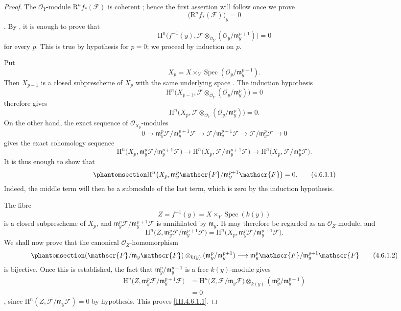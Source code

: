 \documentclass[oneside]{amsart}
\theoremstyle{ega-env-style}
\theoremstyle{ega-thm-env-style}
\theoremstyle{ega-defn-env-style}
\def\mathcal{\mathscr}
\def\sh{\mathcal}                   %
\def\HH{\mathrm{H}}                 %
\def\RR{\mathrm{R}}                 %
\def\kres{k}                        %
\def\Spec{\operatorname{Spec}}
\newcommand{\oldpage}[2][]{{\marginnote{\normalfont{\textbf{#1}~|~#2}}}\ignorespaces}
\let\EGAOriginalLabel\label
\renewcommand{\label}[1]{\phantomsection\EGAOriginalLabel{#1}}
\begin{document}
\begin{proof}
The $\sh{O}_Y$-module $\RR^n f_*(\sh{F})$ is coherent
; hence the first assertion will follow once we prove
\[
  \bigl(\RR^n f_*(\sh{F})\bigr)_y=0
\]
.  By , it is enough to prove that
\[
  \HH^n\bigl(f^{-1}(y),
    \sh{F}\otimes_{\sh{O}_Y}
      (\sh{O}_y/\mathfrak m_y^{p+1})\bigr)=0
\]
for every $p$.  This is true by hypothesis for $p=0$; we proceed by
induction on $p$.

Put
\[
  X_p=X\times_Y
    \Spec(\sh{O}_y/\mathfrak m_y^{p+1}).
\]
Then $X_{p-1}$ is a closed subprescheme of $X_p$ with the same
underlying space .  The induction hypothesis
\[
  \HH^n\bigl(X_{p-1},
    \sh{F}\otimes_{\sh{O}_Y}
      (\sh{O}_y/\mathfrak m_y^p)\bigr)=0
\]
therefore gives
\[
  \HH^n\bigl(X_p,
    \sh{F}\otimes_{\sh{O}_Y}
      (\sh{O}_y/\mathfrak m_y^p)\bigr)=0.
\]
On the other hand, the exact sequence of $\sh{O}_{X_p}$-modules
\[
  0\longrightarrow
  \mathfrak m_y^p\sh{F}/\mathfrak m_y^{p+1}\sh{F}
  \longrightarrow
  \sh{F}/\mathfrak m_y^{p+1}\sh{F}
  \longrightarrow
  \sh{F}/\mathfrak m_y^p\sh{F}
  \longrightarrow0
\]
gives the exact cohomology sequence
\[
  \HH^n\bigl(X_p,
    \mathfrak m_y^p\sh{F}/\mathfrak m_y^{p+1}\sh{F}\bigr)
  \longrightarrow
  \HH^n\bigl(X_p,\sh{F}/\mathfrak m_y^{p+1}\sh{F}\bigr)
  \longrightarrow
  \HH^n\bigl(X_p,\sh{F}/\mathfrak m_y^p\sh{F}\bigr).
\]
It is thus enough to show that
\[
\label{III.4.6.1.1}
  \HH^n\bigl(X_p,
    \mathfrak m_y^p\sh{F}/\mathfrak m_y^{p+1}\sh{F}\bigr)=0.
  \tag{4.6.1.1}
\]
Indeed, the middle term will then be a submodule of the last term,
which is zero by the induction hypothesis.

\oldpage[III]{140}

The fibre
\[
  Z=f^{-1}(y)=X\times_Y\Spec(\kres(y))
\]
is a closed subprescheme of $X_p$, and
$\mathfrak m_y^p\sh{F}/\mathfrak m_y^{p+1}\sh{F}$ is annihilated by
$\mathfrak m_y$.  It may therefore be regarded as an
$\sh{O}_Z$-module, and
\[
  \HH^n\bigl(Z,
    \mathfrak m_y^p\sh{F}/\mathfrak m_y^{p+1}\sh{F}\bigr)
  =
  \HH^n\bigl(X_p,
    \mathfrak m_y^p\sh{F}/\mathfrak m_y^{p+1}\sh{F}\bigr).
\]
We shall now prove that the canonical $\sh{O}_Z$-homomorphism
\[
\label{III.4.6.1.2}
  (\sh{F}/\mathfrak m_y\sh{F})
    \otimes_{\kres(y)}
      (\mathfrak m_y^p/\mathfrak m_y^{p+1})
  \longrightarrow
  \mathfrak m_y^p\sh{F}/\mathfrak m_y^{p+1}\sh{F}
  \tag{4.6.1.2}
\]
is bijective.  Once this is established, the fact that
$\mathfrak m_y^p/\mathfrak m_y^{p+1}$ is a free
$\kres(y)$-module gives
\[
\begin{split}
  \HH^n\bigl(Z,
    \mathfrak m_y^p\sh{F}/\mathfrak m_y^{p+1}\sh{F}\bigr)
  &=
  \HH^n\bigl(Z,\sh{F}/\mathfrak m_y\sh{F}\bigr)
    \otimes_{\kres(y)}
      (\mathfrak m_y^p/\mathfrak m_y^{p+1})\\
  &=0
\end{split}
\]
, since
$\HH^n(Z,\sh{F}/\mathfrak m_y\sh{F})=0$ by hypothesis.  This proves
\eqref{III.4.6.1.1}.


\end{proof}
\end{document}
